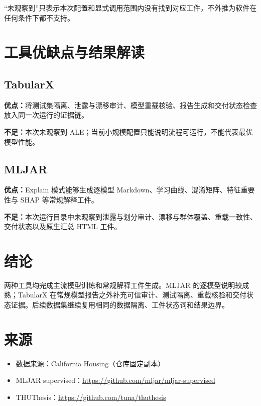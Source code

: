 \documentclass[degree=bachelor,language=chinese,fontset=fandol]{thuthesis}
\begin{document}
“未观察到”只表示本次配置和显式调用范围内没有找到对应工件，不外推为软件在任何条件下都不支持。

\chapter{工具优缺点与结果解读}
\section{TabularX}
\textbf{优点：}将测试集隔离、泄露与漂移审计、模型重载核验、报告生成和交付状态检查放入同一次运行的证据链。

\textbf{不足：}本次未观察到 ALE；当前小规模配置只能说明流程可运行，不能代表最优模型性能。

\section{MLJAR}
\textbf{优点：}Explain 模式能够生成逐模型 Markdown、学习曲线、混淆矩阵、特征重要性与 SHAP 等常规解释工件。

\textbf{不足：}本次运行目录中未观察到泄露与划分审计、漂移与群体覆盖、重载一致性、交付状态以及原生汇总 HTML 工件。

\chapter{结论}
两种工具均完成主流模型训练和常规解释工件生成。MLJAR 的逐模型说明较成熟；TabularX 在常规模型报告之外补充可信审计、测试隔离、重载核验和交付状态证据。后续数据集继续复用相同的数据隔离、工件状态词和结果边界。

\backmatter
\chapter{来源}
\begin{itemize}
  \item 数据来源：California Housing（仓库固定副本）
  \item MLJAR supervised：\url{https://github.com/mljar/mljar-supervised}
  \item THUThesis：\url{https://github.com/tuna/thuthesis}
\end{itemize}
\end{document}
